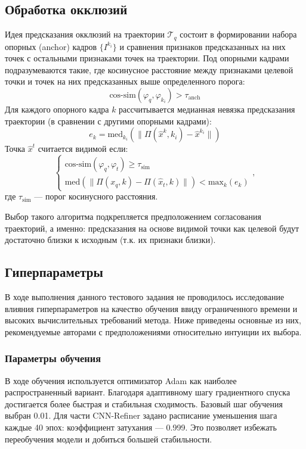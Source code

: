\documentclass[a4paper, 14pt]{extarticle}
\theoremstyle{definition}
\theoremstyle{plain}
\theoremstyle{remark}
\begin{document}
\subsection{Обработка окклюзий}
Идея предсказания окклюзий на траектории $\mathcal{T}_q$ состоит в формировании набора опорных (anchor) кадров $\{I^{k_i}\}$ и сравнения признаков предсказанных на них точек с остальными признаками точек на траектории. Под опорными кадрами подразумеваются такие, где косинусное расстояние между признаками целевой точки и точек на них предсказанных выше определенного порога:
\begin{equation} \label{eq:anch}
	\text{cos-sim}(\varphi_q,\varphi_{k_i}) > \tau_{\text{anch}}
\end{equation}
Для каждого опорного кадра $k$ рассчитывается медианная невязка предсказания траектории (в сравнении с другими опорными кадрами):
\begin{equation}
	e_{k} = \text{med}_{k_i}(\|\Pi(\hat{x}^k,k_i) - \hat{x}^{k_i}\|)
\end{equation}
Точка $\hat{x}^t$ считается видимой если:
\begin{equation} \label{eq:occl}
	\begin{cases}
		\text{cos-sim}(\varphi_q, \varphi_t) \ge \tau_{\text{sim}}\\
		\text{med}(\|\Pi(x_q, k) - \Pi(\hat{x}_t, k)\|) < \text{max}_k(e_k)
	\end{cases},
\end{equation}
где $\tau_{\text{sim}}$ --- порог косинусного расстояния. 

Выбор такого алгоритма подкрепляется предположением согласования траекторий, а именно: предсказания на основе видимой точки как целевой будут достаточно близки к исходным (т.к. их признаки близки).

\subsection{Гиперпараметры}
В ходе выполнения данного тестового задания не проводилось исследование влияния гиперпараметров на качество обучения ввиду ограниченного времени и высоких вычислительных требований метода. Ниже приведены основные из них, рекомендуемые авторами с предположениями относительно интуиции их выбора.
\subsubsection{Параметры обучения}
В ходе обучения используется оптимизатор Adam как наиболее распространенный вариант. Благодаря адаптивному шагу градиентного спуска достигается более быстрая и стабильная сходимость.
Базовый шаг обучения выбран 0.01. Для части CNN-Refiner задано расписание уменьшения шага каждые 40 эпох: коэффициент затухания --- 0.999. Это позволяет избежать переобучения модели и добиться большей стабильности.
\end{document}
